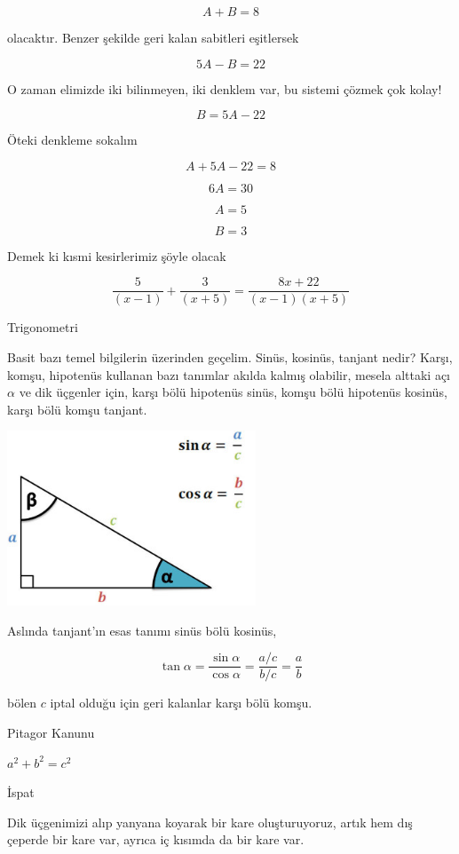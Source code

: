 \documentclass[12pt,fleqn]{article}\usepackage{../../common}
\begin{document}
$$ A + B = 8 $$

olacaktır. Benzer şekilde geri kalan sabitleri eşitlersek 

$$ 5A - B = 22 $$

O zaman elimizde iki bilinmeyen, iki denklem var, bu sistemi çözmek çok
kolay! 

$$ B = 5A - 22 $$

Öteki denkleme sokalım

$$ A + 5A - 22 = 8 $$

$$ 6A = 30 $$

$$ A = 5 $$

$$ B = 3 $$

Demek ki kısmi kesirlerimiz şöyle olacak 

$$ \frac{5}{(x-1)} + \frac{3}{(x+5)} = \frac{8x + 22}{(x-1)(x+5)}$$

\newpage


Trigonometri

Basit bazı temel bilgilerin üzerinden geçelim. Sinüs, kosinüs, tanjant nedir?
Karşı, komşu, hipotenüs kullanan bazı tanımlar akılda kalmış olabilir, mesela
alttaki açı $\alpha$ ve dik üçgenler için, karşı bölü hipotenüs sinüs, komşu
bölü hipotenüs kosinüs, karşı bölü komşu tanjant.

\includegraphics[width=20em]{trig-reciprocal2.jpg}

Aslında tanjant'ın esas tanımı sinüs bölü kosinüs,

$$
\tan \alpha = \frac{\sin\alpha}{\cos\alpha} = \frac{a / c}{b / c} = \frac{a}{b}
$$

bölen $c$ iptal olduğu için geri kalanlar karşı bölü komşu. 

Pitagor Kanunu

$a^2 + b^2 = c^2$

İspat

Dik üçgenimizi alıp yanyana koyarak bir kare oluşturuyoruz, artık hem dış
çeperde bir kare var, ayrıca iç kısımda da bir kare var. 
\end{document}

